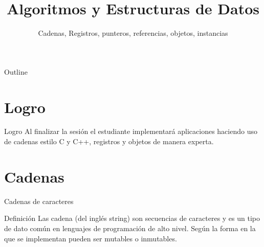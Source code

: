 \documentclass[aspectratio=169]{beamer}
\title{Algoritmos y Estructuras de Datos}
\subtitle{Cadenas, Registros, punteros, referencias, objetos, instancias}
\date{\the\year}
\institute{\href{http://www.upc.edu.pe}{Universidad Peruana de Ciencias Aplicadas}}
\begin{document}
\maketitle

\begin{frame}{Outline}
\tableofcontents
\end{frame}

\section{Logro}
\begin{frame}{Logro}
Al finalizar la sesión el estudiante implementará aplicaciones haciendo uso
de cadenas estilo C y C++, registros y objetos de manera experta.
\end{frame}

\section{Cadenas}
\begin{frame}{Cadenas de caracteres}
\begin{block}{Definición}
Las cadena (del inglés string) son secuencias de caracteres y es un tipo de dato común en lenguajes de programación de alto nivel. Según la forma en la que se implementan pueden ser mutables o inmutables.
\end{block}
\end{frame}
\end{document}
